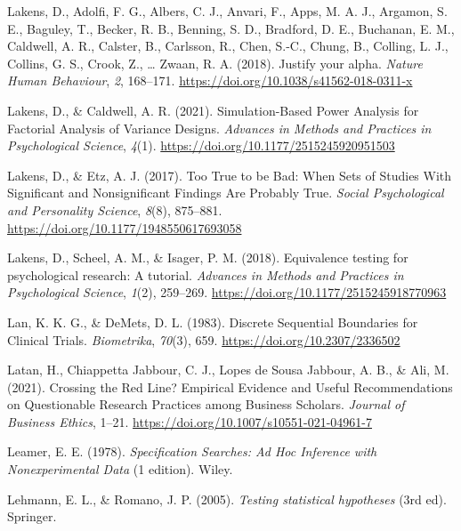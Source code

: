 \documentclass[
  letterpaper,
  DIV=11,
  numbers=noendperiod]{scrreprt}
\newlength{\cslhangindent}
\newlength{\cslentryspacingunit} %
\newenvironment{CSLReferences}[2] %
 {%
  \setlength{\parindent}{0pt}
  \ifodd #1
  \let\oldpar\par
  \def\par{\hangindent=\cslhangindent\oldpar}
  \fi
  \setlength{\parskip}{#2\cslentryspacingunit}
 }%
 {}
\begin{document}
\begin{CSLReferences}{1}{0}
\leavevmode{}%
Lakens, D., Adolfi, F. G., Albers, C. J., Anvari, F., Apps, M. A. J.,
Argamon, S. E., Baguley, T., Becker, R. B., Benning, S. D., Bradford, D.
E., Buchanan, E. M., Caldwell, A. R., Calster, B., Carlsson, R., Chen,
S.-C., Chung, B., Colling, L. J., Collins, G. S., Crook, Z., \ldots{}
Zwaan, R. A. (2018). Justify your alpha. \emph{Nature Human Behaviour},
\emph{2}, 168--171. \url{https://doi.org/10.1038/s41562-018-0311-x}

\leavevmode{}%
Lakens, D., \& Caldwell, A. R. (2021). Simulation-{Based Power Analysis}
for {Factorial Analysis} of {Variance Designs}. \emph{Advances in
Methods and Practices in Psychological Science}, \emph{4}(1).
\url{https://doi.org/10.1177/2515245920951503}

\leavevmode{}%
Lakens, D., \& Etz, A. J. (2017). Too {True} to be {Bad}: {When Sets} of
{Studies With Significant} and {Nonsignificant Findings Are Probably
True}. \emph{Social Psychological and Personality Science}, \emph{8}(8),
875--881. \url{https://doi.org/10.1177/1948550617693058}

\leavevmode{}%
Lakens, D., Scheel, A. M., \& Isager, P. M. (2018). Equivalence testing
for psychological research: {A} tutorial. \emph{Advances in Methods and
Practices in Psychological Science}, \emph{1}(2), 259--269.
\url{https://doi.org/10.1177/2515245918770963}

\leavevmode{}%
Lan, K. K. G., \& DeMets, D. L. (1983). Discrete {Sequential Boundaries}
for {Clinical Trials}. \emph{Biometrika}, \emph{70}(3), 659.
\url{https://doi.org/10.2307/2336502}

\leavevmode{}%
Latan, H., Chiappetta Jabbour, C. J., Lopes de Sousa Jabbour, A. B., \&
Ali, M. (2021). Crossing the {Red Line}? {Empirical Evidence} and
{Useful Recommendations} on {Questionable Research Practices} among
{Business Scholars}. \emph{Journal of Business Ethics}, 1--21.
\url{https://doi.org/10.1007/s10551-021-04961-7}

\leavevmode{}%
Leamer, E. E. (1978). \emph{Specification {Searches}: {Ad Hoc Inference}
with {Nonexperimental Data}} (1 edition). {Wiley}.

\leavevmode{}%
Lehmann, E. L., \& Romano, J. P. (2005). \emph{Testing statistical
hypotheses} (3rd ed). {Springer}.


\end{CSLReferences}
\end{document}
